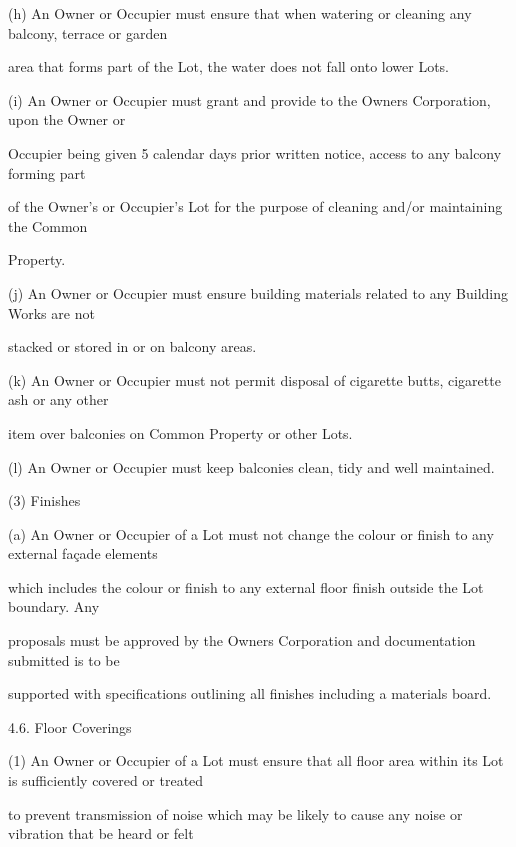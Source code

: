 \documentclass{article}
\begin{document}
{\fontsize{9.962}{1}(h) An Owner or Occupier must ensure that when watering or cleaning any balcony, terrace or garden }

{\fontsize{10.02}{1}area that forms part of the Lot, the water does not fall onto lower Lots. }

{\fontsize{9.962}{1}(i) An Owner or Occupier must grant and provide to the Owners Corporation, upon the Owner or }

{\fontsize{10.02}{1}Occupier being given 5 calendar days prior written notice, access to any balcony forming part }

{\fontsize{10.02}{1}of the Owner's or Occupier's Lot for the purpose of cleaning and/or maintaining the Common }

{\fontsize{10.02}{1}Property. }

{\fontsize{9.962}{1}(j) An Owner or Occupier must ensure building materials related to any Building Works are not }

{\fontsize{10.02}{1}stacked or stored in or on balcony areas. }

{\fontsize{9.962}{1}(k) An Owner or Occupier must not permit disposal of cigarette butts, cigarette ash or any other }


{\fontsize{10.02}{1}item over balconies on Common Property or other Lots. }

{\fontsize{9.962}{1}(l) An Owner or Occupier must keep balconies clean, tidy and well maintained. }

{\fontsize{9.962}{1}(3) Finishes }

{\fontsize{9.962}{1}(a) An Owner or Occupier of a Lot must not change the colour or finish to any external façade elements }

{\fontsize{10.02}{1}which includes the colour or finish to any external floor finish outside the Lot boundary. Any }

{\fontsize{10.02}{1}proposals must be approved by the Owners Corporation and documentation submitted is to be }

{\fontsize{10.02}{1}supported with specifications outlining all finishes including a materials board. }

{\fontsize{9.99}{1}4.6. Floor Coverings }

{\fontsize{9.962}{1}(1) An Owner or Occupier of a Lot must ensure that all floor area within its Lot is sufficiently covered or treated }

{\fontsize{10.02}{1}to prevent transmission of noise which may be likely to cause any noise or vibration that be heard or felt }
\end{document}

